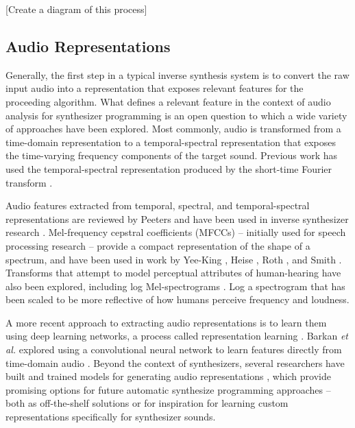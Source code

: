 [Create a diagram of this process]

\subsection{Audio Representations}
Generally, the first step in a typical inverse synthesis system is to convert the raw input audio into a representation that exposes relevant features for the proceeding algorithm. What defines a relevant feature in the context of audio analysis for synthesizer programming is an open question to which a wide variety of approaches have been explored. Most commonly, audio is transformed from a time-domain representation to a temporal-spectral representation that exposes the time-varying frequency components of the target sound. Previous work has used the temporal-spectral representation produced by the short-time Fourier transform \cite{horner1995wavetable, horner1995envelope, horner1996piecewise, chinen2007genesynth, yee2007evolving, barkan2019inversynth}. 

Audio features extracted from temporal, spectral, and temporal-spectral representations are reviewed by Peeters \cite{peeters2004large} and have been used in inverse synthesizer research \cite{mintz2007toward, stowell2010making, mcartwright2014, blancas2014sound}. Mel-frequency cepstral coefficients (MFCCs) -- initially used for speech processing research -- provide a compact representation of the shape of a spectrum, and have been used in work by Yee-King \cite{yee2008synthbot}, Heise \cite{ heise2009automatic}, Roth \cite{roth2011comparison}, and Smith \cite{smith2017play}. Transforms that attempt to model perceptual attributes of human-hearing have also been explored, including log Mel-spectrograms \cite{zhang2018visualization}. Log a spectrogram that has been scaled to be more reflective of how humans perceive frequency and loudness.

A more recent approach to extracting audio representations is to learn them using deep learning networks, a process called representation learning  \cite{bengio2013representation}. Barkan \textit{et al.} explored using a convolutional neural network to learn features directly from time-domain audio \cite{barkan2019inversynth}. Beyond the context of synthesizers, several researchers have built and trained models for generating audio representations \cite{cramer:learnmore:icassp:19, drossos:icml:2020, engel2017neural}, which provide promising options for future automatic synthesize programming approaches -- both as off-the-shelf solutions or for inspiration for learning custom representations specifically for synthesizer sounds.

